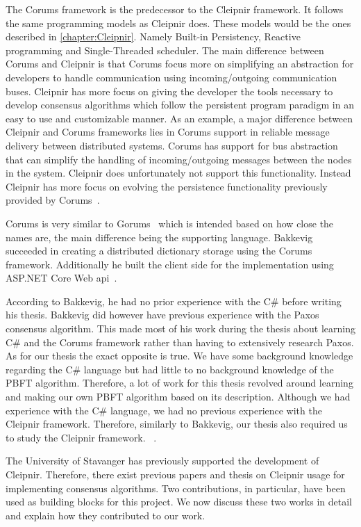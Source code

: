 The Corums framework is the predecessor to the Cleipnir framework. It follows the same programming models as Cleipnir does. These models would be the ones described in \autoref{chapter:Cleipnir}. Namely Built-in Persistency, Reactive programming and Single-Threaded scheduler.
The main difference between Corums and Cleipnir is that Corums focus more on simplifying an abstraction for developers to handle communication using incoming/outgoing communication buses. Cleipnir has more focus on giving the developer the tools necessary to develop consensus algorithms which follow the persistent program paradigm in an easy to use and customizable manner. As an example, a major difference between Cleipnir and Corums frameworks lies in Corums support in reliable message delivery between distributed systems. Corums has support for bus abstraction that can simplify the handling of incoming/outgoing messages between the nodes in the system. Cleipnir does unfortunately not support this functionality. Instead Cleipnir has more focus on evolving the persistence functionality previously provided by Corums~\cites[p.~6-7]{PAPER:PaxosCleipnir}{DOC:Cleipnir}.
 
Corums is very similar to Gorums~\cites[p.~2]{WEB:Gorums}[p.~22]{PAPER:EivindPaper} which is intended based on how close the names are, the main difference being the supporting language.
Bakkevig succeeded in creating a distributed dictionary storage using the Corums framework. Additionally he built the client side for the implementation using ASP.NET Core Web \ac{api}~\cite{WEB:ASPNetCoreAPI}.
 
According to Bakkevig, he had no prior experience with the C\# before writing his thesis. Bakkevig did however have previous experience with the Paxos consensus algorithm. This made most of his work during the thesis about learning C\# and the Corums framework rather than having to extensively research Paxos. As for our thesis the exact opposite is true. We have some background knowledge regarding the C\# language but had little to no background knowledge of the PBFT algorithm. Therefore, a lot of work for this thesis revolved around learning and making our own PBFT algorithm based on its description. Although we had experience with the C\# language, we had no previous experience with the Cleipnir framework. Therefore, similarly to Bakkevig, our thesis also required us to study the Cleipnir framework. ~\cite[p.~8]{PAPER:EivindPaper}.
\fi

The University of Stavanger has previously supported the development of Cleipnir.
Therefore, there exist previous papers and thesis on Cleipnir usage for implementing consensus algorithms.
Two contributions, in particular, have been used as building blocks for this project. We now discuss these two works in detail and explain how they contributed to our work. 
 

